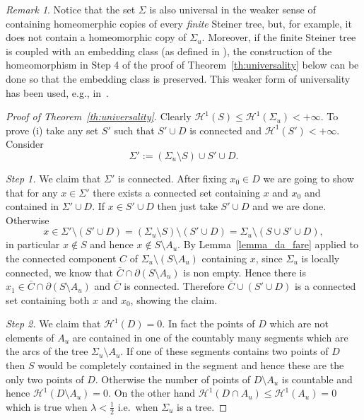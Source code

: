 \documentclass{amsart}
\renewcommand{\H}{\mathcal H}
\renewcommand{\H}{\mathcal{H}}
\theoremstyle{definition}
\theoremstyle{remark}
\newtheorem{remark}[theorem]{Remark}
\begin{document}
\begin{remark}\label{rem:universal}
  Notice that the set $\Sigma$ is also universal in the weaker 
  sense of containing homeomerphic copies of every \emph{finite}
  Steiner tree, but, for example, it does not contain a 
  homeomorphic copy of $\Sigma_u$.
  Moreover, if the finite Steiner tree is coupled with an 
  embedding class (as defined in \cite[lemma 3]{BasCheRasTep24}),
  the construction of the homeomorphism in Step 4 of the proof of Theorem~\ref{th:universality}
  below
  can be done so that the embedding class is preserved.
  This weaker form of universality has been used, e.g., 
  in~\cite{BasCheRasTep24}.
\end{remark}
\begin{proof}[Proof of Theorem~\ref{th:universality}]
Clearly $\H^1(S)\le \H^1(\Sigma_u)<+\infty$.
To prove (i) take any set $S'$ such that $S'\cup D$ is connected 
and $\H^1(S')<+\infty$. 
Consider 
\[
  \Sigma' 
      := (\Sigma_u\setminus S) \cup S' \cup D.
\]

\emph{Step 1.} We claim that $\Sigma'$ is connected.
After fixing $x_0\in D$ we are going to show that for any $x\in \Sigma'$ there exists 
a connected set containing $x$ and $x_0$ and contained in $\Sigma'\cup D$.
If $x\in S'\cup D$ then just take $S'\cup D$ and we are done.
Otherwise 
\[
  x\in \Sigma'\setminus (S'\cup D) 
    = (\Sigma_u\setminus S)\setminus(S'\cup D)
    = \Sigma_u \setminus (S\cup S' \cup D),
\]
in particular $x\not\in S$ and hence $x\not \in S\setminus A_u$.
By Lemma~\ref{lemma_da_fare} applied to the connected component $C$ of 
$\Sigma_u\setminus(S\setminus A_u)$ containing $x$,
since $\Sigma_u$ is locally connected, we know that $\bar C\cap \partial (S\setminus A_u)$
is non empty. Hence there is $x_1\in \bar C \cap \partial (S\setminus A_u)$ and $\bar C$
is connected. Therefore $\bar C \cup (S'\cup D)$ is a connected set containing 
both $x$ and $x_0$, showing the claim.

\emph{Step 2.} 
We claim that $\H^1(D)=0$. 
In fact the points of $D$ which are not elements of $A_u$ are contained 
in one of the countably many segments which are the arcs of the tree $\Sigma_u\setminus A_u$.
If one of these segments contains two points of $D$ then $S$ would be completely contained 
in the segment and hence these are the only two points of $D$.
Otherwise the number of points of $D\setminus A_u$ is countable and hence $\H^1(D\setminus A_u)=0$.
On the other hand $\H^1(D\cap A_u)\le \H^1(A_u)=0$ which is true when $\lambda < \frac 1 2$
i.e.\ when $\Sigma_u$ is a tree.


\end{proof}
\end{document}
